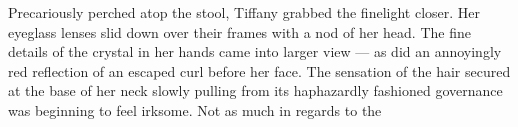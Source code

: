 Precariously perched atop the stool, Tiffany grabbed the finelight closer.
Her eyeglass lenses slid down over their frames with a nod of her head.
The fine details of the crystal in her hands came into larger view --- as did an annoyingly red reflection of an escaped curl before her face.
The sensation of the hair secured at the base of her neck slowly pulling from its haphazardly fashioned governance was beginning to feel irksome.
Not as much in regards to the 